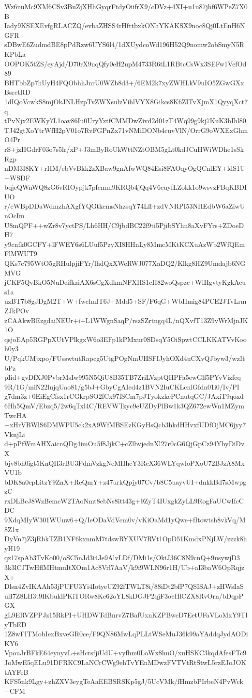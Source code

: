 Wz6nuMc9XM6CSv3BuZjXHhGyqrFtdyOiifrX9/cDVz+4XI+u1u87jhf6WPeZ7X0B
Iady9KSEXEvfgRLACZQ/evbaZHSS4rHfttbxkONhYKAKSX9noc8Qj0LtEnH6NGFR
sDBwE6ZudmdBE8pPdRzw6UYS6l4/1dXUydcoWd196H52Q9nomw2obSmyN5RKPbLa
OOPOK5tZS/eyAjd/D70rX9nqQfy0eH2upM4733R6tL1RBtcCsWx3SEFw1VefOd89
BHTbbZp7hUyH4FQObhhJnrU0WZb8d3+/6EM2k7xyZWHLkV9uIO5ZGwGXxBsrctRD
1dIQoVcwkS8mjOkJNLHzpTvZWXsulzVihlVYX8Gikcs8K6ZITvXjmX1QyyqXct7q
tPvNjx2EWKy7L1oav86Iu0UryYztfCMMDwZivd2d01zT4Wq99g9kj7KuK3hIhl80
TJ42gtXoYtrWfH2pV01o7RvFGPnZx71vNMiDONb4cuvVlN/OrrG9oWXExGhmO4Pr
rS+jzHGdrF03o7s5lr/xP+J3mByRoUkWttNZtOBM5gLt0kdJCuHWiWDhe1sSkRgp
nDM3I8KY+rHM/ebVvBkk2zXBaw9gnAfwWQ84Esi8FAOqyOgQCnlEY+ldS1U+WSDF
bqjcQWnWQ8zG6vRIOypjk7pfemm9KRQb4jQq4V6euyfLZokk1o9wsvzFBqKBDIUO
r/eWBpDDaWdmzhAXgfYQGtkcmsNhzsqY74Lfl+zdVNRPI53NHEdbW6aZiwUnOcIm
U8mQPF++wZr8v7yctPS/Lh6HH/C9jbdBC22f9ti5PjibSYhn8aXvFYrs+ZDoeDH7
y9cnfk0GCFY+lFWEY6s6LUuf5PzyXI8HHnLy8MmcMKtKCXuAzWb2WfQEmFlMWUT9
QKs7c795WtO5gRHulpjiFYr/lhdQxXWeRWJ077XaDQ2/Klkg8HZ9Umdajb6NGMVG
jCKF5QvBkO5NuDeifkziAX6sCgXdkmNFXHS1cH82woQspzc+WlHgvtyKgkAeus1a
uzBT7b8gJDgM2T+W+fwclmIT6J+Mdd5+SF/F6qG+WbHmig84PCE2JTvLrmZJkPOv
zCAAkwBEzgdaiNEUr+i+L1WWgnSaqP/rszSZrtngq4L/nQXvfT13Z9vWrMjnJK1O
qsjoEAp5RGPpXUtVPlkgxW6o3EFp1kPMxur0SDsqY5OiSpwtCCLKKATVvKooh0y3
U/PqkUMjxpo/FUsswtutRapcg5UtgPOgNmUHSFIJyhOXd4uCXvQJbyw3/wzItbPz
pIid+gvDfXJ0PvbrMsIw995N5QiU8B35TB7ZriLVzptQHPFa5ewGlf5PYvVizfeq
9R/1G/miN22lujqUao81/g5bJ+GbyCgAIed4z1BVN2IuCKLcnlGfdn01i0/Iv/PI
g7dm3z+0EiEgCfsx1rCGkrpSO2fCx97fSCm7pJTyokzkcPCnutqGC/JAxiT9qoxd
6Hh5QmV/Ebzq5/2w6qTxl4C/REVWTzyc9eUZDyPlBw1k3QZ672ewWn1MZymTwcHA
+xHrVBWlS6DMWPU5ck2xA9WfMBSEzKGyHsQcb3hkdHHvxfUDfOjMC6jyy7VknjLi
d+pPfWmAHXaicnQDg4imOu5f8JjkC+cZlbvjednXl27r0cG6QjGpCz94YbyDiDvX
bjv8bh0igt5KnQH3rBU3PdmVzkgNeMHhcY3RcX36WLYqwloPXoU72BJzA8MxVU1b
bDK8a0epLitzY9ZnX+ReQmY+z47urkQpjy07Cv/b8C5uayvUI+dnkkBd7sMwpgzC
rxDLBcJ8WzBemcW2TAoNmt8ebNs8itt43g+9ZyT4IUxgkZyLL9RogFaUCwIfcCDC
9XdqMIyW301WUuw6+Q/IeODaVdVcm0v/vKiOaMd1yQwe+fItowtsh8vkVq/M8Z1x
DyVn7jZ3jRbkTZB1NF6kxnmM7tdswRYXUV7RVt1OpD51KmdxPNjLW/zzzk8hyH19
qz17spAb3TvKo00/oSC5nJd3i4Je9AlvLDf/DMi1s/OkiJ36C8N9cnQ+9usywjD3
3k3lCJTwHflMHtmuItXOm1Ac8Vrl7AaV/k9i9WLN96r1H/Ub+aI3baW6OpRqjzX+
Dlsn4ZvIKAAh53jPUFU3Yi4IotyeUZ92fTWLT8i/88iDt2bfP7QSISAJ+zHWsIaS
ulI7Z8LH3t9IKbuklPKiTORw8Ke62oYL8kDGJP2qjF3oeHlCZX8RvOrn/bDqpPGX
gL9ERVZPPJz15RkPI+UHDWTdBnrvZ7BafUxnKZPBwcD7EetUFaVLoMxY9TlyTbED
1Z8wFITMobIexBxveGR0ce/F9QN86MwLqPLLtWSeMuJ36k99aYAddqJydAODiKY6
VpouJrBFkE64eynyvL+sHcrsfjiUdU+vyfhm0LoWx8huO/xuHSKC3kqdAfesFTc9
JoMwE5qELu91DFRKC9LaNCrCWg9ehTvYEnMDwzFVTVtRtStwL5rzEJoJOKtAYFeB
KFS5nk9Lgy+zhZXV3eygTeAaEEBSRSKp5gJ/5UcVMk/fHmzbPIrbeN4PvWck+CFM
